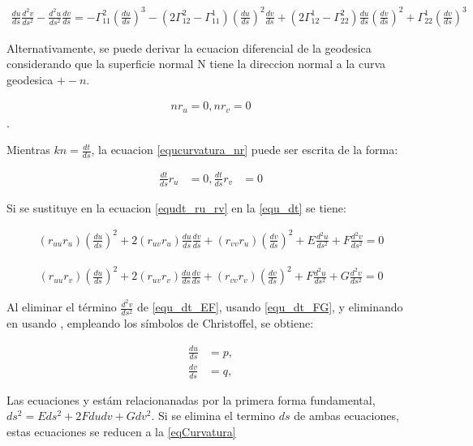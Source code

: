 \documentclass{endm}
\begin{document}
\begin{align} 
\frac{du}{ds} \frac{d^2v}{ds^2} - \frac{d^2u}{ds^2} \frac{dv}{ds} = -  \Gamma_{11}^2 (\frac{du}{ds})^3 - (2 \Gamma_{12}^2 -  \Gamma_{11}^1 ) (\frac{du}{ds})^2 \frac{dv}{ds} + (2 \Gamma_{12}^1 - \Gamma_{22}^2) \frac{du}{ds} (\frac{dv}{ds})^2 + \Gamma_{22}^1 (\frac{dv}{ds})^3
\label{eqCurvatura}
\end{align}

Alternativamente, se puede derivar la ecuacion diferencial de la geodesica considerando que la superficie normal N tiene la direccion normal a la curva geodesica $+- n$.

\begin{align} 
n r_u = 0, n r_v = 0
\label{equcurvatura_nr}
\end{align}.

Mientras $kn = \frac{dt}{ds} $, la ecuacion 
\ref{equcurvatura_nr} 
puede ser escrita de la forma:

\begin{align} 
\frac{dt}{ds} r_u &=0,\frac{dt}{ds} r_v &=0
\label{equdt_ru_rv}
\end{align}

Si se sustituye en la ecuacion \ref{equdt_ru_rv} en la \ref{equ_dt} se tiene:

\begin{align} 
(r_{uu} r_u) (\frac{du}{ds})^2 + 2 (r_{uv} r_u) \frac{du}{ds} \frac{dv}{ds} + (r_{vv} r_u) (\frac{dv}{ds})^2 + E \frac{d^2u}{ds^2} + F \frac{d^2v}{ds^2} = 0
\label{equ_dt_EF}
\end{align}


\begin{align} 
(r_{uu} r_v) (\frac{du}{ds})^2 + 2 (r_{uv} r_v) \frac{du}{ds} \frac{dv}{ds} + (r_{vv} r_v) (\frac{dv}{ds})^2 + F \frac{d^2u}{ds^2} + G \frac{d^2v}{ds^2} = 0
\label{equ_dt_FG}
\end{align}

Al eliminar el t\'ermino $\frac{d^2v}{ds^2}$ de \ref{equ_dt_EF}, usando \ref{equ_dt_FG}, y eliminando en \label{equ_dt_FG} usando \label{equ_dt_EF}, empleando los s\'imbolos de Christoffel, se obtiene:

\begin{align} 
\frac{du}{ds}&=p, \label{equ1_Geo}\\
\frac{dv}{ds}&=q, \label{equ2_Geo}
\end{align}

Las ecuaciones \label{equ1_Geo} y \label{equ2_Geo} est\'am relacionanadas por la primera forma fundamental, $ds^2 = E ds^2+ 2 Fdudv+ G dv^2$. Si se elimina el termino $ds$ de ambas ecuaciones, estas ecuaciones se reducen a la \ref{eqCurvatura}
\end{document}
